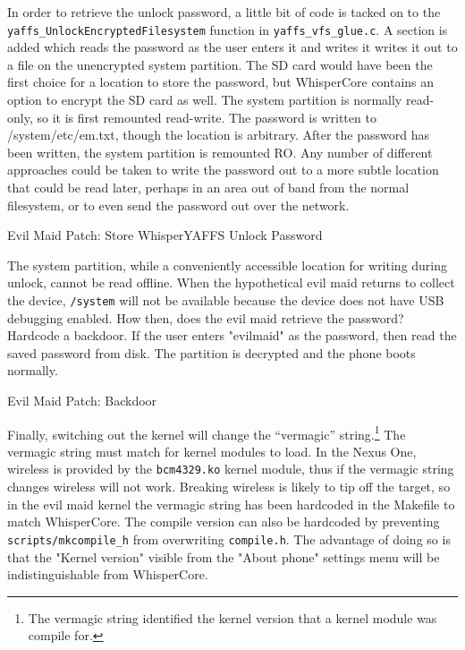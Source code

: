 In order to retrieve the unlock password, a little bit of code is tacked on to the \texttt{yaffs\_UnlockEncryptedFilesystem}
function in \texttt{yaffs\_vfs\_glue.c}. A section is added which reads the password as the user enters it and writes it writes it
out to a file on the unencrypted system partition.  The SD card would have been the first choice for a location to store the
password, but WhisperCore contains an option to encrypt the SD card as well. The system partition is normally read-only, so it is
first remounted read-write. The password is written to /system/etc/em.txt, though the location is arbitrary. After the password has
been written, the system partition is remounted RO. Any number of different approaches could be taken to write the password out to a
more subtle location that could be read later, perhaps in an area out of band from the normal filesystem, or to even send the
password out over the network. 

\begin{table}

\label{tab:storepass}
\caption{Evil Maid Patch: Store WhisperYAFFS Unlock Password}
\end{table}

The system partition, while a conveniently accessible location for writing during unlock, cannot be read offline.  When the
hypothetical evil maid returns to collect the device, \texttt{/system} will not be available because the device does not have USB
debugging enabled.  How then, does the evil maid retrieve the password? Hardcode a backdoor.  If the user enters "evilmaid" as the
password, then read the saved password from disk.  The partition is decrypted and the phone boots normally. 

\begin{table}

\label{tab:backdoor}
\caption{Evil Maid Patch: Backdoor}
\end{table}

Finally, switching out the kernel will change the ``vermagic'' string.\footnote{The vermagic string identified the kernel version
that a kernel module was compile for.} The vermagic string must match for kernel modules to load.  In the Nexus One, wireless is
provided by the \texttt{bcm4329.ko} kernel module, thus if the vermagic string changes wireless will not work.  Breaking wireless is likely
to tip off the target, so in the evil maid kernel the vermagic string has been hardcoded in the Makefile to match WhisperCore. 
The compile version can also be hardcoded by preventing \texttt{scripts/mkcompile\_h} from overwriting \texttt{compile.h}. 
The advantage of doing so is that the "Kernel version" visible from the "About phone" settings menu will be indistinguishable from WhisperCore.

